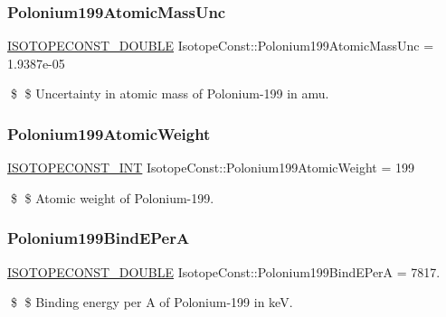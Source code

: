\subsubsection{\texorpdfstring{Polonium199\+Atomic\+Mass\+Unc}{Polonium199AtomicMassUnc}}
{\footnotesize\ttfamily \mbox{\hyperlink{group___isotope_const-_macros_ga8f45a7272ce02c0b4c65c44636ed719a}{I\+S\+O\+T\+O\+P\+E\+C\+O\+N\+S\+T\+\_\+\+D\+O\+U\+B\+LE}} Isotope\+Const\+::\+Polonium199\+Atomic\+Mass\+Unc = 1.\+9387e-\/05}

\$ \$ Uncertainty in atomic mass of Polonium-\/199 in amu. \mbox{\label{group___isotope_const-_polonium-_po199_ga84febb4b10cca2d8373541dbc0e2d09d}} 
\subsubsection{\texorpdfstring{Polonium199\+Atomic\+Weight}{Polonium199AtomicWeight}}
{\footnotesize\ttfamily \mbox{\hyperlink{group___isotope_const-_macros_ga5f18360b3e99483a35c32d789e62621c}{I\+S\+O\+T\+O\+P\+E\+C\+O\+N\+S\+T\+\_\+\+I\+NT}} Isotope\+Const\+::\+Polonium199\+Atomic\+Weight = 199}

\$ \$ Atomic weight of Polonium-\/199. \mbox{\label{group___isotope_const-_polonium-_po199_ga97ef633825b108b61bea62af3a318edf}} 
\subsubsection{\texorpdfstring{Polonium199\+Bind\+E\+PerA}{Polonium199BindEPerA}}
{\footnotesize\ttfamily \mbox{\hyperlink{group___isotope_const-_macros_ga8f45a7272ce02c0b4c65c44636ed719a}{I\+S\+O\+T\+O\+P\+E\+C\+O\+N\+S\+T\+\_\+\+D\+O\+U\+B\+LE}} Isotope\+Const\+::\+Polonium199\+Bind\+E\+PerA = 7817.}

\$ \$ Binding energy per A of Polonium-\/199 in keV. \mbox{\label{group___isotope_const-_polonium-_po199_ga1eb1651c9e12c78719574f83cd7b001c}} 
